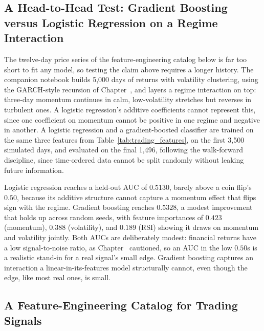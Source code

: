 \documentclass[../ai_in_finance]{subfiles}
\begin{document}
\subsection{A Head-to-Head Test: Gradient Boosting versus Logistic Regression on a Regime Interaction}
\label{sec:ml-trading-signal}

The twelve-day price series of the feature-engineering catalog below is far too short to fit any model, so testing the claim above requires a longer history. The companion notebook builds 5,000 days of returns with volatility clustering, using the GARCH-style recursion of Chapter~, and layers a regime interaction on top: three-day momentum continues in calm, low-volatility stretches but reverses in turbulent ones. A logistic regression's additive coefficients cannot represent this, since one coefficient on momentum cannot be positive in one regime and negative in another. A logistic regression and a gradient-boosted classifier are trained on the same three features from Table~\ref{tab:trading_features}, on the first 3,500 simulated days, and evaluated on the final 1,496, following the walk-forward discipline, since time-ordered data cannot be split randomly without leaking future information.

Logistic regression reaches a held-out AUC of $0.5130$, barely above a coin flip's $0.50$, because its additive structure cannot capture a momentum effect that flips sign with the regime. Gradient boosting reaches $0.5328$, a modest improvement that holds up across random seeds, with feature importances of $0.423$ (momentum), $0.388$ (volatility), and $0.189$ (RSI) showing it draws on momentum and volatility jointly. Both AUCs are deliberately modest: financial returns have a low signal-to-noise ratio, as Chapter~ cautioned, so an AUC in the low $0.50$s is a realistic stand-in for a real signal's small edge. Gradient boosting captures an interaction a linear-in-its-features model structurally cannot, even though the edge, like most real ones, is small.

\subsection{A Feature-Engineering Catalog for Trading Signals}
\label{sec:trading-feature-engineering}
\end{document}
